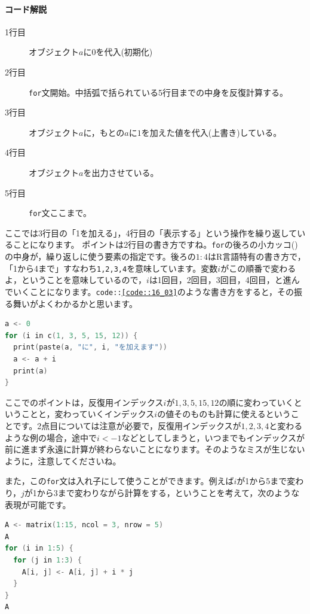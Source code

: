 \documentclass{ltjsbook}
\begin{document}
\paragraph{コード解説}
\begin{description}
        \item[1行目] オブジェクト$a$に$0$を代入(初期化)
        \item[2行目] \texttt{for}文開始。中括弧で括られている5行目までの中身を反復計算する。
        \item[3行目] オブジェクト$a$に，もとの$a$に$1$を加えた値を代入(上書き)している。
        \item[4行目] オブジェクト$a$を出力させている。
        \item[5行目] \texttt{for}文ここまで。
\end{description}

ここでは3行目の「1を加える」，4行目の「表示する」という操作を繰り返していることになります。
ポイントは2行目の書き方ですね。\texttt{for}の後ろの小カッコ()の中身が，繰り返しに使う要素の指定です。後ろの$1:4$はR言語特有の書き方で，「1から4まで」すなわち\verb|1,2,3,4|を意味しています。変数$i$がこの順番で変わるよ，ということを意味しているので，$i$は1回目，2回目，3回目，4回目，と進んでいくことになります。\texttt{code::\ref{code::16_03}}のような書き方をすると，その振る舞いがよくわかるかと思います。

\begin{lstlisting}[language=c++,label={code::16_03},caption={反復操作2}]
a <- 0
for (i in c(1, 3, 5, 15, 12)) {
  print(paste(a, "に", i, "を加えます"))
  a <- a + i
  print(a)
}
\end{lstlisting}

ここでのポイントは，反復用インデックス$i$が$1,3,5,15,12$の順に変わっていくということと，変わっていくインデックス$i$の値そのものも計算に使えるということです。2点目については注意が必要で，反復用インデックスが$1,2,3,4$と変わるような例の場合，途中で$i <- 1$などとしてしまうと，いつまでもインデックスが前に進まず永遠に計算が終わらないことになります。そのようなミスが生じないように，注意してくださいね。

また，この\verb|for|文は入れ子にして使うことができます。例えば$i$が1から5まで変わり，$j$が1から3まで変わりながら計算をする，ということを考えて，次のような表現が可能です。
\begin{lstlisting}[language=c++,label={code::16_32},caption={反復操作1}]
A <- matrix(1:15, ncol = 3, nrow = 5)
A
for (i in 1:5) {
  for (j in 1:3) {
    A[i, j] <- A[i, j] + i * j
  }
}
A
\end{lstlisting}
\end{document}
